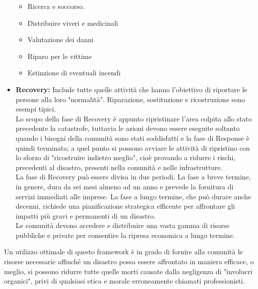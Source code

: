 \begin{itemize}
\begin{itemize}
\item Ricerca e soccorso.
\item Distribuire viveri e medicinali
\item Valutazione dei danni
\item Riparo per le vittime
\item Estinzione di eventuali incendi
\end{itemize}
\item \textbf{Recovery:} Include tutte quelle attività che hanno l'obiettivo di riportare le persone alla loro "normalità". Riparazione, sostituzione e ricostruzione sono esempi tipici.\\
Lo scopo della fase di Recovery è appunto ripristinare l'area colpita allo stato precedente la catastrofe, tuttavia le azioni devono essere eseguite soltanto quando i bisogni della comunità sono stati soddisfatti e la fase di Response è quindi terminata; a quel punto si possono avviare le attività di ripristino con lo sforzo di "ricostruire indietro meglio", cioè provando a ridurre i rischi, precedenti al disastro, presenti nella comunità e nelle infrastrutture.\\
La fase di Recovery può essere divisa in due periodi. La fase a breve termine, in genere, dura da sei mesi almeno ad un anno e prevede la fornitura di servizi immediati alle imprese. La fase a lungo termine, che può durare anche decenni, richiede una pianificazione strategica efficente per affrontare gli impatti più gravi e permanenti di un disastro. \\
Le comunità devono accedere e distribuire una vasta gamma di risorse pubbliche e private per consentire la ripresa economica a lungo termine.
\end{itemize}
Un utilizzo ottimale di questo framework è in grado di fornire alla comunità le risorse necessarie affinché un disastro possa essere affrontato in maniera efficace, o meglio, si possono ridurre tutte quelle morti causate dalla negligenza di "involucri organici", privi di qualsiasi etica e morale erroneamente chiamati professionisti.
\newpage


